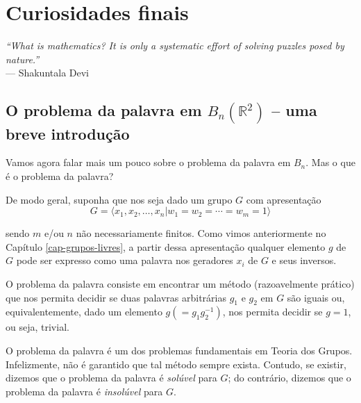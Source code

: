 \chapter[Curiosidades finais]{Curiosidades finais}
\label{cap-6}
\chaptermark{}
%
\hfill%
\begin{minipage}{10cm}
\begin{flushright}
\rightskip=0.5cm
\textit{``What is mathematics? It is only a systematic effort of solving puzzles posed by nature.''}
\\[0.1cm]
\rightskip=0.5cm
--- Shakuntala Devi
\end{flushright}
\end{minipage}

\section{O problema da palavra em \texorpdfstring{$B_n(\mathbb{R}^2)$}{BnR2} -- uma breve introdução}
\label{secao o problema da palavra}
	Vamos agora falar mais um pouco sobre o problema da palavra em $B_n$. Mas o que é o problema da palavra?
	
	\par\vspace{0.3cm} De modo geral, suponha que nos seja dado um grupo $G$ com apresentação
	\begin{equation*}
	    G = \langle x_1, x_2, \dots, x_n| w_1=w_2=\cdots=w_m=1 \rangle
	\end{equation*}
	\par\vspace{0.3cm} sendo $m$ e/ou $n$ não necessariamente finitos. Como vimos anteriormente no 
	Capítulo \ref{cap-grupos-livres}, a partir dessa apresentação qualquer elemento $g$ de $G$ pode ser 
	expresso como uma palavra nos geradores $x_i$ de $G$ e seus inversos. 
	
	\par\vspace{0.3cm} O problema da palavra consiste em encontrar um método (razoavelmente prático) que 
	nos permita decidir se duas palavras arbitrárias $g_1$ e $g_2$ em $G$ são iguais ou, equivalentemente, 
	dado um elemento $g (=g_1g_2^{-1})$, nos permita decidir se $g=1$, ou seja, trivial.
	
	\par\vspace{0.3cm} O problema da palavra é um dos problemas fundamentais em Teoria dos Grupos. 
	Infelizmente, não é garantido que tal método sempre exista. Contudo, se existir, dizemos que o problema 
	da palavra é \textit{solúvel} para $G$; do contrário, dizemos que o problema da palavra é 
	\textit{insolúvel} para $G$.  
	
